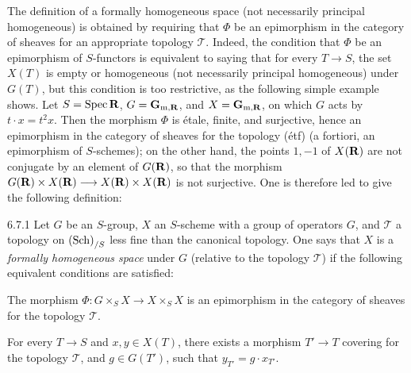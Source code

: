 The definition of a formally
homogeneous space (not necessarily
principal homogeneous) is obtained
by requiring that \(\Phi\) be an
epimorphism in the category of
sheaves for an appropriate topology
\(\mathcal T\).
Indeed, the condition that \(\Phi\)
be an epimorphism of \(S\)-functors
is equivalent to saying that for
every \(T\to S\), the set \(X(T)\)
is empty or homogeneous (not
necessarily principal homogeneous)
under \(G(T)\), but this condition
is too restrictive, as the following
simple example shows.
Let \(S=\operatorname{Spec}\mathbf{R}\), \(G=\mathbf G_{\mathrm m,\mathbf{R}}\),
and \(X=\mathbf G_{\mathrm m,\mathbf{R}}\),
on which \(G\) acts by \(t\cdot x=t^2x\).
Then the morphism \(\Phi\) is étale,
finite, and surjective, hence an
epimorphism in the category of
sheaves for the topology (étf)
(a fortiori, an epimorphism of
\(S\)-schemes); on the other hand,
the points \(1,-1\) of \(X(\mathbf{R})\)
are not conjugate by an element
of \(G(\mathbf{R})\), so that the
morphism \(G(\mathbf{R})\times X(\mathbf{R})\longrightarrow
X(\mathbf{R})\times X(\mathbf{R})\) is not surjective.
One is therefore led to give the following definition:
\begin{definition}{6.7.1}\label{IV.6.7.1}
Let \(G\) be an \(S\)-group,
\(X\) an \(S\)-scheme with a
group of operators \(G\),
and \(\mathcal T\) a topology
on \(\textup{(Sch)}_{/S}\) less fine
than the canonical topology.
One says that \(X\) is a
\emph{formally homogeneous space}
under \(G\) (relative to the
topology \(\mathcal T\)) if
the following equivalent
conditions are satisfied:
\begin{enumeratei}
\item The morphism \(\Phi:G\times_S X\to X\times_S X\)
is an epimorphism in the category
of sheaves for the topology \(\mathcal T\).
\item For every \(T\to S\)
and \(x,y\in X(T)\), there
exists a morphism \(T'\to T\)
covering for the topology
\(\mathcal T\), and \(g\in G(T')\),
such that \(y_{T'}=g\cdot x_{T'}\).
\end{enumeratei}
\end{definition}

